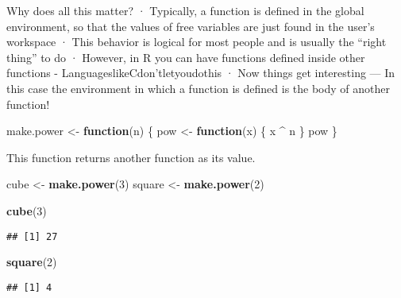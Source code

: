 \documentclass[
]{article}
\newenvironment{Shaded}{\begin{snugshade}}{\end{snugshade}}
\newcommand{\ControlFlowTok}[1]{\textcolor[rgb]{0.13,0.29,0.53}{\textbf{#1}}}
\newcommand{\DecValTok}[1]{\textcolor[rgb]{0.00,0.00,0.81}{#1}}
\newcommand{\FunctionTok}[1]{\textcolor[rgb]{0.13,0.29,0.53}{\textbf{#1}}}
\newcommand{\NormalTok}[1]{#1}
\newcommand{\OtherTok}[1]{\textcolor[rgb]{0.56,0.35,0.01}{#1}}
\newcommand{\SpecialCharTok}[1]{\textcolor[rgb]{0.81,0.36,0.00}{\textbf{#1}}}
\begin{document}
Why does all this matter? · Typically, a function is defined in the
global environment, so that the values of free variables are just found
in the user's workspace · This behavior is logical for most people and
is usually the ``right thing'' to do · However, in R you can have
functions defined inside other functions -
LanguageslikeCdon'tletyoudothis · Now things get interesting --- In this
case the environment in which a function is defined is the body of
another function!

\begin{Shaded}
\begin{Highlighting}[]
\NormalTok{make.power }\OtherTok{\textless{}{-}} \ControlFlowTok{function}\NormalTok{(n) \{}
\NormalTok{  pow }\OtherTok{\textless{}{-}} \ControlFlowTok{function}\NormalTok{(x) \{}
\NormalTok{    x }\SpecialCharTok{\^{}}\NormalTok{ n}
\NormalTok{  \}}
\NormalTok{  pow}
\NormalTok{\}}
\end{Highlighting}
\end{Shaded}

This function returns another function as its value.

\begin{Shaded}
\begin{Highlighting}[]
\NormalTok{cube }\OtherTok{\textless{}{-}} \FunctionTok{make.power}\NormalTok{(}\DecValTok{3}\NormalTok{)}
\NormalTok{square }\OtherTok{\textless{}{-}} \FunctionTok{make.power}\NormalTok{(}\DecValTok{2}\NormalTok{)}
\end{Highlighting}
\end{Shaded}

\begin{Shaded}
\begin{Highlighting}[]
\FunctionTok{cube}\NormalTok{(}\DecValTok{3}\NormalTok{)}
\end{Highlighting}
\end{Shaded}

\begin{verbatim}
## [1] 27
\end{verbatim}

\begin{Shaded}
\begin{Highlighting}[]
\FunctionTok{square}\NormalTok{(}\DecValTok{2}\NormalTok{)}
\end{Highlighting}
\end{Shaded}

\begin{verbatim}
## [1] 4
\end{verbatim}
\end{document}
